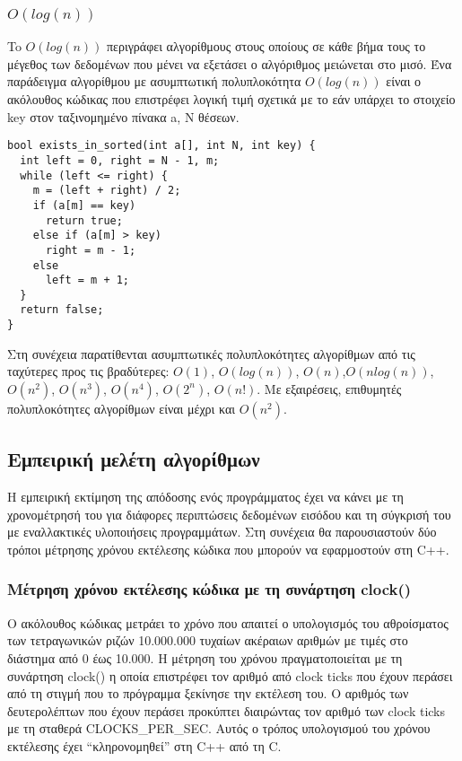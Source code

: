 \subsubsection{$O(log(n))$}
To $O(log(n))$ περιγράφει αλγορίθμους στους οποίους σε κάθε βήμα τους το μέγεθος των δεδομένων που μένει να εξετάσει ο αλγόριθμος μειώνεται στο μισό. Ένα παράδειγμα αλγορίθμου με ασυμπτωτική πολυπλοκότητα $O(log(n))$ είναι ο ακόλουθος κώδικας που επιστρέφει λογική τιμή σχετικά με το εάν υπάρχει το στοιχείο key στον ταξινομημένο πίνακα a, N θέσεων.
\begin{lstlisting}
bool exists_in_sorted(int a[], int N, int key) {
  int left = 0, right = N - 1, m;
  while (left <= right) {
    m = (left + right) / 2;
    if (a[m] == key)
      return true;
    else if (a[m] > key)
      right = m - 1;
    else
      left = m + 1;
  }
  return false;
}
\end{lstlisting}

Στη συνέχεια παρατίθενται ασυμπτωτικές πολυπλοκότητες αλγορίθμων από τις ταχύτερες προς τις βραδύτερες: $O(1)$, $O(log(n))$, $O(n)$,$O(nlog(n))$, $O(n^2)$, $O(n^3)$, $O(n^4)$, $O(2^n)$, $O(n!)$. Με εξαιρέσεις, επιθυμητές πολυπλοκότητες αλγορίθμων είναι μέχρι και $O(n^2)$.

\subsection{Εμπειρική μελέτη αλγορίθμων}
H εμπειρική εκτίμηση της απόδοσης ενός προγράμματος έχει να κάνει με τη χρονομέτρησή του για διάφορες περιπτώσεις δεδομένων εισόδου και τη σύγκρισή του με εναλλακτικές υλοποιήσεις προγραμμάτων. Στη συνέχεια θα παρουσιαστούν δύο τρόποι μέτρησης χρόνου εκτέλεσης κώδικα που μπορούν να εφαρμοστούν στη C++.

\subsubsection{Μέτρηση χρόνου εκτέλεσης κώδικα με τη συνάρτηση clock()}
Ο ακόλουθος κώδικας μετράει το χρόνο που απαιτεί ο υπολογισμός του αθροίσματος των τετραγωνικών ριζών 10.000.000 τυχαίων ακέραιων αριθμών με τιμές στο διάστημα από 0  έως 10.000. Η μέτρηση του χρόνου πραγματοποιείται με τη συνάρτηση clock() η οποία επιστρέφει τον αριθμό από clock ticks που έχουν περάσει από τη στιγμή που το πρόγραμμα ξεκίνησε την εκτέλεση του. Ο αριθμός των δευτερολέπτων που έχουν περάσει προκύπτει διαιρώντας τον αριθμό των clock ticks με τη σταθερά CLOCKS\_PER\_SEC. Αυτός ο τρόπος υπολογισμού του χρόνου εκτέλεσης έχει ``κληρονομηθεί'' στη C++ από τη C.

